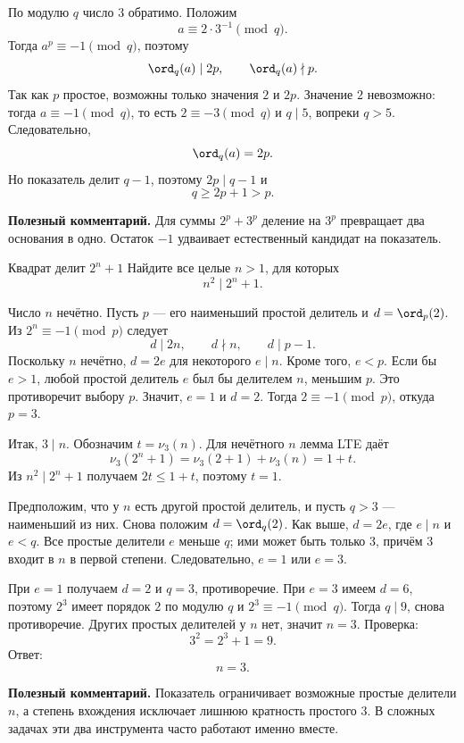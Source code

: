\begin{solutionbox}
По модулю $q$ число $3$ обратимо. Положим
\[
  a\equiv2\cdot3^{-1}\pmod q.
\]
Тогда $a^p\equiv-1\pmod q$, поэтому
\[
  \ord_q(a)\mid2p,
  \qquad
  \ord_q(a)\nmid p.
\]
Так как $p$ простое, возможны только значения $2$ и $2p$. Значение
$2$ невозможно: тогда $a\equiv-1\pmod q$, то есть
$2\equiv-3\pmod q$ и $q\mid5$, вопреки $q>5$. Следовательно,
\[
  \ord_q(a)=2p.
\]
Но показатель делит $q-1$, поэтому $2p\mid q-1$ и
\[
  \boxed{q\ge2p+1>p}.
\]

\textbf{Полезный комментарий.}
Для суммы $2^p+3^p$ деление на $3^p$ превращает два основания в одно.
Остаток $-1$ удваивает естественный кандидат на показатель.
\end{solutionbox}

\begin{problembox}{Квадрат делит $2^n+1$}
Найдите все целые $n>1$, для которых
\[
  n^2\mid2^n+1.
\]
\end{problembox}

\begin{solutionbox}
Число $n$ нечётно. Пусть $p$ --- его наименьший простой делитель и
$d=\ord_p(2)$. Из $2^n\equiv-1\pmod p$ следует
\[
  d\mid2n,
  \qquad d\nmid n,
  \qquad d\mid p-1.
\]
Поскольку $n$ нечётно, $d=2e$ для некоторого $e\mid n$. Кроме того,
$e<p$. Если бы $e>1$, любой простой делитель $e$ был бы делителем
$n$, меньшим $p$. Это противоречит выбору $p$. Значит, $e=1$ и
$d=2$. Тогда $2\equiv-1\pmod p$, откуда $p=3$.

Итак, $3\mid n$. Обозначим $t=\nu_3(n)$. Для нечётного $n$ лемма
LTE даёт
\[
  \nu_3(2^n+1)=\nu_3(2+1)+\nu_3(n)=1+t.
\]
Из $n^2\mid2^n+1$ получаем $2t\le1+t$, поэтому $t=1$.

Предположим, что у $n$ есть другой простой делитель, и пусть $q>3$
--- наименьший из них. Снова положим $d=\ord_q(2)$. Как выше,
$d=2e$, где $e\mid n$ и $e<q$. Все простые делители $e$ меньше $q$;
ими может быть только $3$, причём $3$ входит в $n$ в первой степени.
Следовательно, $e=1$ или $e=3$.

При $e=1$ получаем $d=2$ и $q=3$, противоречие. При $e=3$ имеем
$d=6$, поэтому $2^3$ имеет порядок $2$ по модулю $q$ и
$2^3\equiv-1\pmod q$. Тогда $q\mid9$, снова противоречие. Других
простых делителей у $n$ нет, значит $n=3$. Проверка:
\[
  3^2=2^3+1=9.
\]
Ответ:
\[
  \boxed{n=3}.
\]

\textbf{Полезный комментарий.}
Показатель ограничивает возможные простые делители $n$, а степень
вхождения исключает лишнюю кратность простого $3$. В сложных задачах
эти два инструмента часто работают именно вместе.
\end{solutionbox}

